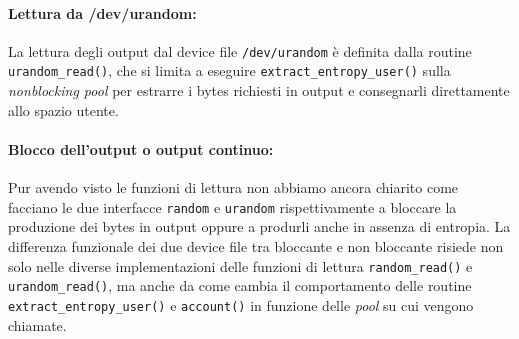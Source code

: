 \documentclass{article}
\begin{document}
 
 
 \paragraph{Lettura da /dev/urandom:} La lettura degli output dal device file
 \verb+/dev/urandom+ è definita dalla routine \verb+urandom_read()+, che si
 limita a eseguire \verb+extract_entropy_user()+ sulla \emph{nonblocking pool}
 per estrarre i bytes richiesti in output e consegnarli direttamente allo spazio
 utente. 
 
 \paragraph{Blocco dell'output o output continuo:} Pur avendo visto le
 funzioni di lettura non abbiamo ancora chiarito come facciano le due interfacce
 \verb+random+ e \verb+urandom+ rispettivamente a bloccare la produzione dei
 bytes in output oppure a produrli anche in assenza di entropia. La differenza
 funzionale dei due device file tra bloccante e non bloccante risiede non solo
 nelle diverse implementazioni delle funzioni di lettura \verb+random_read()+ e
 \verb+urandom_read()+, ma anche da come cambia il comportamento delle routine
 \verb+extract_entropy_user()+ e \verb+account()+ in funzione delle \emph{pool}
 su cui vengono chiamate.
 
\end{document}
